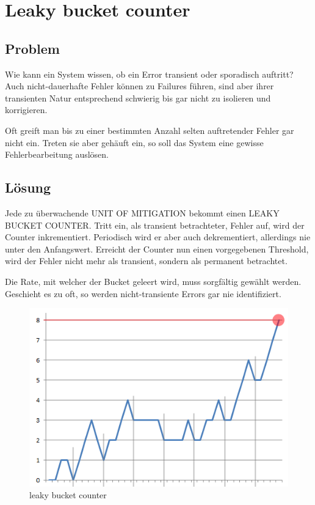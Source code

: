 \section{Leaky bucket counter}


\subsection{Problem}


Wie kann ein System wissen, ob ein Error transient oder sporadisch auftritt? Auch nicht-dauerhafte Fehler können zu Failures führen, sind aber ihrer transienten Natur entsprechend schwierig bis gar nicht zu isolieren und korrigieren.

Oft greift man bis zu einer bestimmten Anzahl selten auftretender Fehler gar nicht ein. Treten sie aber gehäuft ein, so soll das System eine gewisse Fehlerbearbeitung auslösen.

\subsection{Lösung}


Jede zu überwachende UNIT OF MITIGATION bekommt einen LEAKY BUCKET COUNTER. Tritt ein, als transient betrachteter, Fehler auf, wird der Counter inkrementiert. Periodisch wird er aber auch dekrementiert, allerdings nie unter den Anfangswert. Erreicht der Counter nun einen vorgegebenen Threshold, wird der Fehler nicht mehr als transient, sondern als permanent betrachtet.

Die Rate, mit welcher der Bucket geleert wird, muss sorgfältig gewählt werden. Geschieht es zu oft, so werden nicht-transiente Errors gar nie identifiziert.

\begin{figure}[H]
	\centering
	\includegraphics[width=\textwidth]{content/faulttolerance/images/leaky_bucket_counter.png}
	\caption{leaky bucket counter}
\end{figure}


